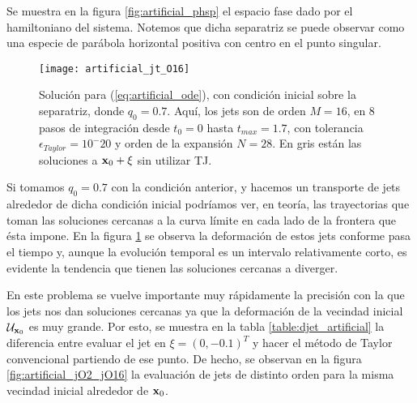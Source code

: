 Se muestra en la figura \ref{fig:artificial_phsp} el espacio fase dado por el hamiltoniano del sistema. Notemos que dicha separatriz se puede observar como una especie de parábola horizontal positiva con centro en el punto singular.

\begin{figure}[h!]
 \centering
 \texttt{[image: artificial\_jt\_O16]}
 \caption{Solución para (\ref{eq:artificial_ode}), con condición inicial sobre la separatriz, donde $q_0 = 0.7$. Aquí, los jets son de orden $M=16$, en $8$ pasos de integración desde $t_0 = 0$ hasta $t_{max} = 1.7$, con tolerancia $\epsilon_{Taylor} = 10^-{20}$ y orden de la expansión $N=28$. En gris están las soluciones a $\mathbf{x}_0 + \xi$ sin utilizar TJ.}
 \label{fig:artificial_jt}
\end{figure}

Si tomamos $q_0 = 0.7$ con la condición anterior, y hacemos un transporte de jets alrededor de dicha condición inicial podríamos ver, en teoría, las trayectorias que toman las soluciones cercanas a la curva límite en cada lado de la frontera que ésta impone. En la figura \ref{fig:artificial_jt} se observa la deformación de estos jets conforme pasa el tiempo y, aunque la evolución temporal es un intervalo relativamente corto, es evidente la tendencia que tienen las soluciones cercanas a diverger.

En este problema se vuelve importante muy rápidamente la precisión con la que los jets nos dan soluciones cercanas ya que la deformación de la vecindad inicial $\mathcal{U}_{\mathbf{x}_0}$ es muy grande. Por esto, se muestra en la tabla \ref{table:djet_artificial} la diferencia entre evaluar el jet en $\xi = (0,-0.1)^T$ y hacer el método de Taylor convencional partiendo de ese punto. De hecho, se observan en la figura \ref{fig:artificial_jO2_jO16} la evaluación de jets de distinto orden para la misma vecindad inicial alrededor de $\mathbf{x}_0$.


